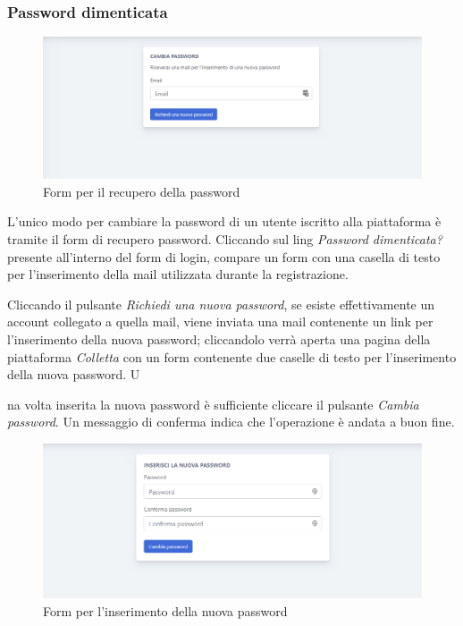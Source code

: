     \subsubsection{Password dimenticata}
    	\begin{figure}[H]
        	\centering
        	\includegraphics[width=1\linewidth]{sez/img/autenticazione/passwordDimenticata.png} 
        	\caption{Form per il recupero della password}\label{fig:1}
    	\end{figure}
	L'unico modo per cambiare la password di un utente iscritto alla piattaforma è  tramite il form di recupero password. Cliccando sul ling \textit{Password dimenticata?} presente all'interno del form di login, compare un form con una casella di testo per l'inserimento della mail utilizzata durante la registrazione. 
	
	Cliccando il pulsante \textit{Richiedi una nuova password}, se esiste effettivamente un account collegato a 	quella mail, viene inviata una mail contenente un link per l'inserimento della nuova password; cliccandolo verrà aperta una pagina della piattaforma \textit{Colletta} con un form contenente due caselle di testo per l'inserimento della nuova password. U
	
	na volta inserita la nuova password è sufficiente cliccare il pulsante \textit{Cambia password}. Un messaggio di conferma indica che l'operazione è andata a buon fine.
\begin{figure}[H]
        	\centering
        	\includegraphics[width=1\linewidth]{sez/img/autenticazione/password.png} 
        	\caption{Form per l'inserimento della nuova password}\label{fig:1}
    	\end{figure}	
	
